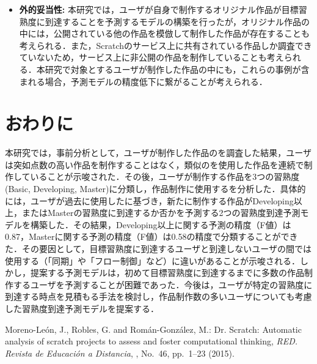 \documentclass[submit]{ipsj}
\begin{document}
{\begin{itemize}
\item \textbf{外的妥当性: }本研究では，ユーザが自身で制作するオリジナル作品が目標習熟度に到達することを予測するモデルの構築を行ったが，オリジナル作品の中には，公開されている他の作品を模倣して制作した作品が存在することも考えられる．また，Scratchのサービス上に共有されている作品しか調査できていないため，サービス上に非公開の作品を制作していることも考えられる．本研究で対象とするユーザが制作した作品の中にも，これらの事例が含まれる場合，予測モデルの精度低下に繋がることが考えられる．
\end{itemize}


\section{おわりに}\label{sec:conclusion}
本研究では，事前分析として，ユーザが制作した作品の\textcolor{red}{}を調査した結果，ユーザは突如点数の高い作品を制作することはなく，類似の\textcolor{red}{}を使用した作品を連続で制作していることが示唆された．その後，ユーザが制作する作品を3つの習熟度 (Basic, Developing, Master)に分類し，作品制作に使用する\textcolor{red}{}を分析した．具体的には，ユーザが過去に使用した\textcolor{red}{}に基づき，新たに制作する作品がDeveloping以上，またはMasterの習熟度に到達するか否かを予測する2つの習熟度到達予測モデルを構築した．その結果，Developing以上に関する予測の精度（F値）は0.87，Masterに関する予測の精度（F値）は0.58の精度で分類することができた．その要因として，目標習熟度に到達するユーザと到達しないユーザの間では使用する\textcolor{red}{}（「同期」や「フロー制御」など）に違いがあることが示唆される．しかし，提案する予測モデルは，初めて目標習熟度に到達するまでに多数の作品制作するユーザを予測することが困難であった．今後は，ユーザが特定の習熟度に到達する時点を見積もる手法を検討し，作品制作数の多いユーザについても考慮した習熟度到達予測モデルを提案する．


%
%

\begin{thebibliography}{10}

\textcolor{red}{}

Moreno-Le{\'o}n, J., Robles, G. and Rom{\'a}n-Gonz{\'a}lez, M.: Dr. Scratch:
  Automatic analysis of scratch projects to assess and foster computational
  thinking, {\em RED. Revista de Educaci{\'o}n a Distancia},  \textcolor{red}{}, No.~46,
  pp.\ 1--23 (2015).


\end{thebibliography}}
\end{document}
